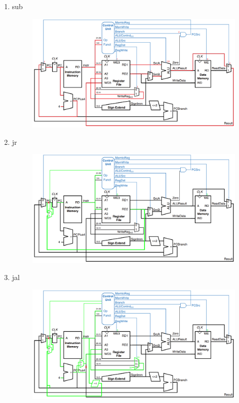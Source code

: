 \documentclass{article}
\begin{document}
\begin{enumerate}
    \item sub\\

\begin{figure}[H]
    \centering
    \includegraphics[width=1\linewidth]{sub.png}
\end{figure}

    \item jr\\

\begin{figure}[H]
    \centering
    \includegraphics[width=1\linewidth]{jr.png}
\end{figure}

    \item jal\\

\begin{figure}[H]
    \centering
    \includegraphics[width=1\linewidth]{jal.png}
\end{figure}


\end{enumerate}
\end{document}
